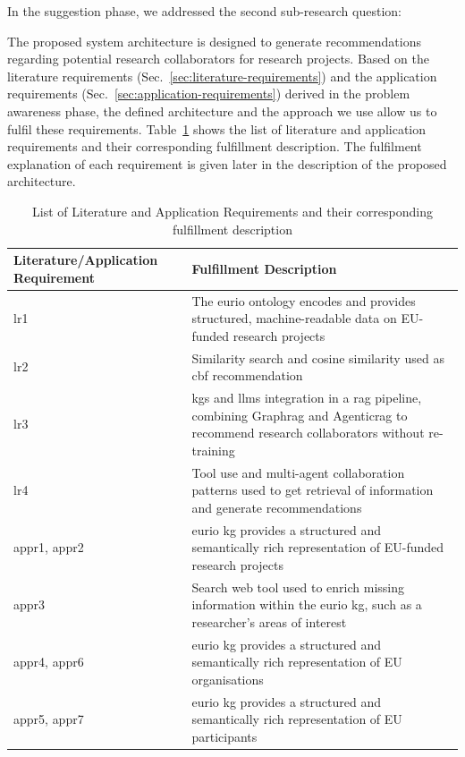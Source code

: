 In the suggestion phase, we addressed the second sub-research question:
\begin{center}
    \rqTwo
\end{center}

The proposed system architecture is designed to generate recommendations regarding potential research collaborators for research projects.
Based on the literature requirements (Sec.~\ref{sec:literature-requirements}) and the application requirements (Sec.~\ref{sec:application-requirements}) derived in the problem awareness phase, the defined architecture and the approach we use allow us to fulfil these requirements.
Table~\ref{tab:requirements-fulfillment} shows the list of literature and application requirements and their corresponding fulfillment description.
The fulfilment explanation of each requirement is given later in the description of the proposed architecture.

\begin{table}[htbp]
    \centering
    \scriptsize
    \begin{tabularx}{\textwidth}{|>{\centering\arraybackslash}p{3.5cm}|X|}
      \hline
      \textbf{Literature/Application Requirement} & \textbf{Fulfillment Description}\\
        \hline
        \gls{lr}1 & The \gls{eurio} ontology encodes and provides structured, machine-readable data on EU-funded research projects\\
        \gls{lr}2 &  Similarity search and cosine similarity used as \gls{cbf} recommendation\\
        \gls{lr}3 & \glspl{kg} and \glspl{llm} integration in a \gls{rag} pipeline, combining Graph\gls{rag} and Agentic\gls{rag} to recommend research collaborators without re-training \\
        \gls{lr}4 &  Tool use and multi-agent collaboration patterns used to get retrieval of information and generate recommendations\\
        \gls{appr}1, \gls{appr}2 &  \gls{eurio} \gls{kg} provides a structured and semantically rich representation of EU-funded research projects \\
        \gls{appr}3 & Search web tool used to enrich missing information within the \gls{eurio} \gls{kg}, such as a researcher's areas of interest\\
        \gls{appr}4, \gls{appr}6 &  \gls{eurio} \gls{kg} provides a structured and semantically rich representation of EU organisations \\
        \gls{appr}5, \gls{appr}7 &  \gls{eurio} \gls{kg} provides a structured and semantically rich representation of EU participants \\
        \hline
    \end{tabularx}
    \caption{List of Literature and Application Requirements and their corresponding fulfillment description}
    \label{tab:requirements-fulfillment}
\end{table}



